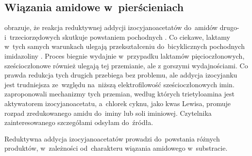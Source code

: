 \subsection{Wiązania amidowe w~pierścieniach}\label{literature:schwartz:rings}
 obrazuje, że reakcja reduktywnej addycji izocyjanoacetatów
   do~amidów drugo-  i~trzeciorzędowych
   skutkuje powstaniem pochodnych 
  .
Co ciekawe,  laktamy  w~tych samych warunkach ulegają
  przekształceniu do~bicyklicznych pochodnych imidazoliny .
Proces biegnie wydajnie w~przypadku laktamów pięcioczłonowych, sześcioczłonowe również ulegają
  tej przemianie, ale z gorszymi wydajnościami.
Co prawda redukcja tych drugich przebiega bez problemu, ale addycja izocyjanku jest trudniejsza
  ze~względu na~niższą elektrofilowość sześcioczłonowych imin.
\citeauthor{zheng17} zaproponowali mechanizmy tych przemian, według których trietyloamina
  jest aktywatorem izocyjanoacetatu, a~chlorek cyknu, jako kwas Lewisa, promuje rozpad
  zredukowanego amidu do~iminy lub soli iminiowej.
Czytelnika zainteresowanego szczegółami odsyłam do~źródła.
\begin{marginscheme}[-27\baselineskip]
  
  \caption{
    Reduktywna addycja izocyjanoacetatów prowadzi do~powstania różnych produktów,
      w~zależności od~charakteru wiązania amidowego w~substracie.
  }
  \label{sch:zr-ncac-add}
\end{marginscheme}

